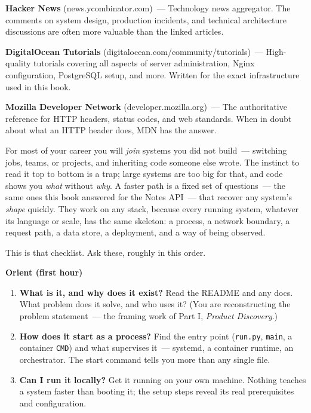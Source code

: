 \textbf{Hacker News} (news.ycombinator.com)~--- Technology news aggregator. The comments on system design, production incidents, and technical architecture discussions are often more valuable than the linked articles.

\textbf{DigitalOcean Tutorials} (digitalocean.com/community/tutorials)~--- High-quality tutorials covering all aspects of server administration, Nginx configuration, PostgreSQL setup, and more. Written for the exact infrastructure used in this book.

\textbf{Mozilla Developer Network} (developer.mozilla.org)~--- The authoritative reference for HTTP headers, status codes, and web standards. When in doubt about what an HTTP header does, MDN has the answer.

\label{ch:44-appendices-5}

\chapterrule

For most of your career you will \emph{join} systems you did not build~--- switching jobs, teams, or projects, and inheriting code someone else wrote. The instinct to read it top to bottom is a trap; large systems are too big for that, and code shows you \emph{what} without \emph{why}. A faster path is a fixed set of questions~--- the same ones this book answered for the Notes API~--- that recover any system's \emph{shape} quickly. They work on any stack, because every running system, whatever its language or scale, has the same skeleton: a process, a network boundary, a request path, a data store, a deployment, and a way of being observed.

This is that checklist. Ask these, roughly in this order.

\textbf{Orient (first hour)}

\begin{enumerate}
\def\labelenumi{\arabic{enumi}.}
\tightlist
\item
  \textbf{What is it, and why does it exist?} Read the README and any docs. What problem does it solve, and who uses it? (You are reconstructing the problem statement~--- the framing work of Part I, \emph{Product Discovery}.)
\item
  \textbf{How does it start as a process?} Find the entry point (\texttt{run.py}, \texttt{main}, a container \texttt{CMD}) and what supervises it~--- systemd, a container runtime, an orchestrator. The start command tells you more than any single file.
\item
  \textbf{Can I run it locally?} Get it running on your own machine. Nothing teaches a system faster than booting it; the setup steps reveal its real prerequisites and configuration.
\end{enumerate}

